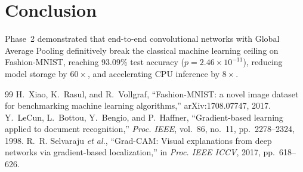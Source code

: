 \documentclass[conference]{IEEEtran}
\begin{document}
\section{Conclusion}
Phase~2 demonstrated that end-to-end convolutional networks with Global Average Pooling definitively break the classical machine learning ceiling on Fashion-MNIST, reaching 93.09\% test accuracy ($p = 2.46\times10^{-11}$), reducing model storage by $60\times$, and accelerating CPU inference by $8\times$.

\begin{thebibliography}{99}
 H.~Xiao, K.~Rasul, and R.~Vollgraf, ``Fashion-MNIST: a novel image dataset for benchmarking machine learning algorithms,'' arXiv:1708.07747, 2017.
 Y.~LeCun, L.~Bottou, Y.~Bengio, and P.~Haffner, ``Gradient-based learning applied to document recognition,'' \emph{Proc. IEEE}, vol.~86, no.~11, pp.~2278--2324, 1998.
 R.~R. Selvaraju \emph{et al.}, ``Grad-CAM: Visual explanations from deep networks via gradient-based localization,'' in \emph{Proc. IEEE ICCV}, 2017, pp.~618--626.
\end{thebibliography}
\end{document}

